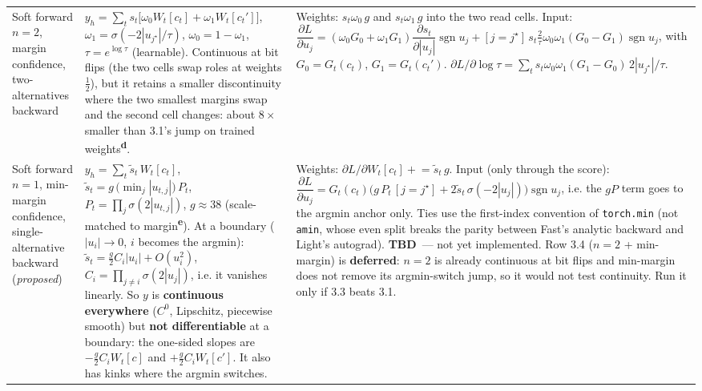 \documentclass[10pt]{article}
\newcommand{\tbd}[1]{\textcolor{red!70!black}{\textbf{TBD}~--- #1}}
\newcommand{\code}[1]{{\renewcommand{\_}{\textunderscore\allowbreak}\texttt{#1}}}
\newcommand{\sgn}{\operatorname{sgn}}
\newcommand{\note}[1]{\textsuperscript{\textbf{#1}}}
\begin{document}
\begin{longtable}{>{\raggedright\arraybackslash}p{2.9cm} >{\raggedright\arraybackslash}p{8.8cm} >{\raggedright\arraybackslash}p{12.0cm}}
3.2 Soft forward $n{=}2$, margin confidence, two-alternatives backward &
$y_h=\sum_t s_t\big[\omega_0W_t[c_t]+\omega_1W_t[c_t']\big]$, \newline
$\omega_1=\sigma(-2|u_{j^\star}|/\tau)$, $\omega_0=1-\omega_1$, $\tau=e^{\log\tau}$ (learnable). \newline
Continuous at bit flips (the two cells swap roles at weights $\tfrac12$), but it retains a smaller discontinuity where the two smallest margins
swap and the second cell changes: about $8\times$ smaller than 3.1's jump on trained weights\note{d}. &
Weights: $s_t\omega_0\,g$ and $s_t\omega_1\,g$ into the two read cells. \newline
Input: $\dfrac{\partial L}{\partial u_j}=(\omega_0G_0+\omega_1G_1)\dfrac{\partial s_t}{\partial|u_j|}\sgn u_j+[j=j^\star]\,s_t\tfrac{2}{\tau}\omega_0\omega_1(G_0-G_1)\sgn u_j$,
with $G_0=G_t(c_t)$, $G_1=G_t(c_t')$. \newline
$\partial L/\partial\log\tau=\sum_t s_t\omega_0\omega_1(G_1-G_0)\,2|u_{j^\star}|/\tau$. \\[3pt]
3.3 Soft forward $n{=}1$, min-margin confidence, single-alternative backward (\emph{proposed}) &
$y_h=\sum_t \tilde s_t\,W_t[c_t]$, $\tilde s_t=g\,\big(\min_j|u_{t,j}|\big)\,P_t$, $P_t=\prod_j\sigma(2|u_{t,j}|)$, $g\approx38$ (scale-matched to margin\note{e}). \newline
At a boundary ($|u_i|\to0$, $i$ becomes the argmin): $\tilde s_t=\tfrac g2 C_i|u_i|+O(u_i^2)$, $C_i=\prod_{j\neq i}\sigma(2|u_j|)$, i.e. it vanishes linearly.
So $y$ is \textbf{continuous everywhere} ($C^0$, Lipschitz, piecewise smooth) but \textbf{not differentiable} at a boundary:
the one-sided slopes are $-\tfrac g2C_iW_t[c]$ and $+\tfrac g2C_iW_t[c']$. It also has kinks where the argmin switches. &
Weights: $\partial L/\partial W_t[c_t]\mathrel{+}=\tilde s_t\,g$. \newline
Input (only through the score): $\dfrac{\partial L}{\partial u_j}=G_t(c_t)\big(g\,P_t\,[j=j^\star]+2\tilde s_t\,\sigma(-2|u_j|)\big)\sgn u_j$, i.e. the $gP$ term goes to the argmin anchor only.
Ties use the first-index convention of \code{torch.min} (not \code{amin}, whose even split breaks the parity between Fast's analytic backward and Light's autograd). \newline
\tbd{not yet implemented.} Row 3.4 ($n=2$ + min-margin) is \textbf{deferred}: $n=2$ is already continuous at bit flips and min-margin does not remove its
argmin-switch jump, so it would not test continuity. Run it only if 3.3 beats 3.1. \\
\end{longtable}
\end{document}
